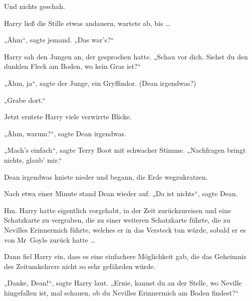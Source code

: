 Und nichts geschah.

Harry ließ die Stille etwas andauern, wartete ab, bis …

„Ähm“, sagte jemand. „Das war’s?“

Harry sah den Jungen an, der gesprochen hatte. „Schau vor dich. Siehst du den dunklen Fleck am Boden, wo kein Gras ist?“

„Ähm, ja“, sagte der Junge, ein Gryffindor. (Dean irgendwas?)

„Grabe dort.“

Jetzt erntete Harry viele verwirrte Blicke.

„Ähm, warum?“, sagte Dean irgendwas.

„Mach’s einfach“, sagte Terry Boot mit schwacher Stimme. „Nachfragen bringt nichts, glaub’ mir.“

Dean irgendwas kniete nieder und begann, die Erde wegzukratzen.

Nach etwa einer Minute stand Dean wieder auf. „Da ist nichts“, sagte Dean.

Hm. Harry hatte eigentlich vorgehabt, in der Zeit zurückzureisen und eine Schatzkarte zu vergraben, die zu einer weiteren Schatzkarte führte, die zu Nevilles Erinnermich führte, welches er in das Versteck tun würde, sobald er es von Mr~Goyle zurück hatte …

Dann fiel Harry ein, dass es eine einfachere Möglichkeit gab, die das Geheimnis des Zeitumkehrers nicht so sehr gefährden würde.

„Danke, Dean!“, sagte Harry laut. „Ernie, kannst du an der Stelle, wo Neville hingefallen ist, mal schauen, ob du Nevilles Erinnermich am Boden findest?“

